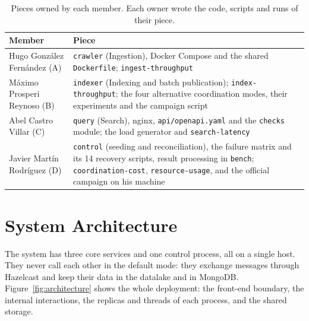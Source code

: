 \documentclass[11pt,a4paper]{article}
\newcommand{\code}[1]{\nolinkurl{#1}}
\begin{document}
\begin{table}[ht]
\centering
\small
\caption{Pieces owned by each member. Each owner wrote the code, scripts and runs of their piece.}
\label{tab:team}
\begin{tabularx}{\textwidth}{@{}lY@{}}
\toprule
Member & Piece \\
\midrule
Hugo González Fernández (A) & \code{crawler} (Ingestion), Docker Compose and the shared \code{Dockerfile}; \code{ingest-throughput} \\
Máximo Prosperi Reynoso (B) & \code{indexer} (Indexing and batch publication); \code{index-throughput}; the four alternative coordination modes, their experiments and the campaign script \\
Abel Castro Villar (C) & \code{query} (Search), nginx, \code{api/openapi.yaml} and the \code{checks} module; the load generator and \code{search-latency} \\
Javier Martín Rodríguez (D) & \code{control} (seeding and reconciliation), the failure matrix and its 14 recovery scripts, result processing in \code{bench}; \code{coordination-cost}, \code{resource-usage}, and the official campaign on his machine \\
\bottomrule
\end{tabularx}
\end{table}
\section{System Architecture}
\label{sec:architecture}

The system has three core services and one control process, all on a single host. They never call each other in the
default mode: they exchange messages through Hazelcast and keep their data in the datalake and in MongoDB.
Figure~\ref{fig:architecture} shows the whole deployment: the front-end boundary, the internal interactions, the
replicas and threads of each process, and the shared storage.
\end{document}
